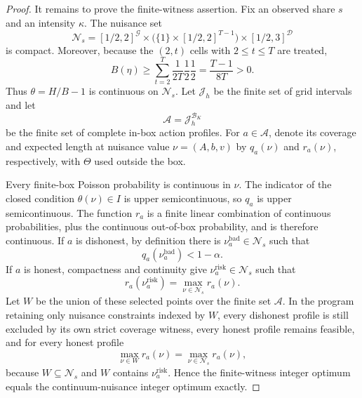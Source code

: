 \documentclass{article}
\begin{document}
\begin{proof}
It remains to prove the finite-witness assertion.  Fix an observed share \(s\) and an intensity \(\kappa\).  The nuisance set
\[
 \mathcal N_s=[1/2,2]^{\mathcal G}
 \times\bigl(\{1\}\times[1/2,2]^{T-1}\bigr)
 \times[1/2,3]^{\mathcal D}
\]
is compact.  Moreover, because the \((2,t)\) cells with \(2\le t\le T\) are treated,
\[
 B(\eta)\ge \sum_{t=2}^T
 \frac1{2T}\frac12\frac12
 =\frac{T-1}{8T}>0.
\]
Thus \(\theta=H/B-1\) is continuous on \(\mathcal N_s\).  Let \(\mathcal J_h\) be the finite set of grid intervals and let
\[
 \mathcal A=\mathcal J_h^{\mathcal B_K}
\]
be the finite set of complete in-box action profiles.  For \(a\in\mathcal A\), denote its coverage and expected length at nuisance value \(\nu=(A,b,v)\) by \(q_a(\nu)\) and \(r_a(\nu)\), respectively, with \(\Theta\) used outside the box.

Every finite-box Poisson probability is continuous in \(\nu\).  The indicator of the closed condition \(\theta(\nu)\in I\) is upper semicontinuous, so \(q_a\) is upper semicontinuous.  The function \(r_a\) is a finite linear combination of continuous probabilities, plus the continuous out-of-box probability, and is therefore continuous.  If \(a\) is dishonest, by definition there is \(\nu_a^{\mathrm{bad}}\in\mathcal N_s\) such that
\[
 q_a(\nu_a^{\mathrm{bad}})<1-\alpha.
\]
If \(a\) is honest, compactness and continuity give \(\nu_a^{\mathrm{risk}}\in\mathcal N_s\) such that
\[
 r_a(\nu_a^{\mathrm{risk}})=\max_{\nu\in\mathcal N_s}r_a(\nu).
\]
Let \(W\) be the union of these selected points over the finite set \(\mathcal A\).  In the program retaining only nuisance constraints indexed by \(W\), every dishonest profile is still excluded by its own strict coverage witness, every honest profile remains feasible, and for every honest profile
\[
 \max_{\nu\in W}r_a(\nu)
 =\max_{\nu\in\mathcal N_s}r_a(\nu),
\]
because \(W\subseteq\mathcal N_s\) and \(W\) contains \(\nu_a^{\mathrm{risk}}\).  Hence the finite-witness integer optimum equals the continuum-nuisance integer optimum exactly.


\end{proof}
\end{document}
